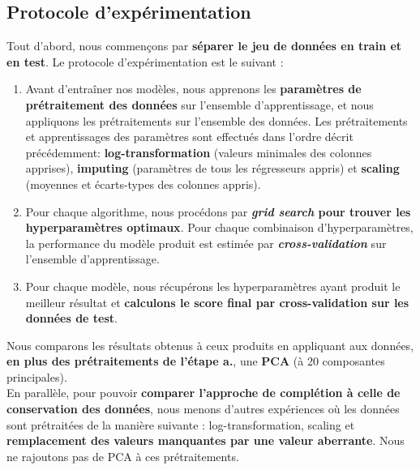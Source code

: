 \documentclass[12pt]{article}
\begin{document}
\subsection{Protocole d'expérimentation} 

Tout d'abord, nous commençons par \textbf{séparer le jeu de données en train et
en test}. Le protocole d'expérimentation est le suivant :

\begin{enumerate}[label=\alph*.]
    
    \item   Avant d'entraîner nos modèles, nous apprenons les
        \textbf{paramètres de prétraitement des données} sur l'ensemble
        d'apprentissage, et nous appliquons les prétraitements sur l'ensemble
        des données.  Les prétraitements et apprentissages des paramètres sont
        effectués dans l'ordre décrit précédemment: \textbf{log-transformation}
        (valeurs minimales des colonnes apprises), \textbf{imputing} (paramètres
        de tous les régresseurs appris) et \textbf{scaling} (moyennes et
        écarts-types des colonnes appris). 

\item Pour chaque algorithme, nous procédons par \textbf{\emph{grid search} pour
    trouver les hyperparamètres optimaux}. Pour chaque combinaison
        d'hyperparamètres, la performance du modèle produit est estimée par
        \textbf{\emph{cross-validation}} sur l'ensemble d'apprentissage.

\item Pour chaque modèle, nous récupérons les hyperparamètres ayant produit le
    meilleur résultat et \textbf{calculons le score final par cross-validation
        sur les données de test}. \\

\end{enumerate}

Nous comparons les résultats obtenus à ceux produits en appliquant aux données,
\textbf{en plus des prétraitements de l'étape a.}, une \textbf{PCA} (à 20
composantes principales). \\

En parallèle, pour pouvoir \textbf{comparer l'approche de complétion à celle de
conservation des données}, nous menons d'autres expériences où les données sont
prétraitées de la manière suivante : log-transformation, scaling et
\textbf{remplacement des valeurs manquantes par une valeur aberrante}. Nous ne
rajoutons pas de PCA à ces prétraitements. 
\end{document}
